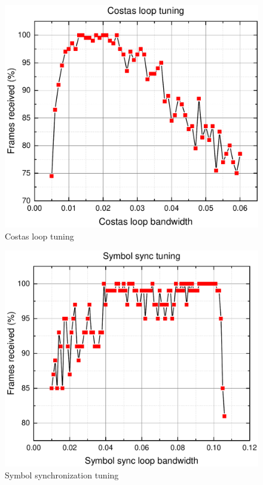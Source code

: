 \begin{figure}[H]
    \centering
    \includegraphics[width=0.6\paperwidth]{img/7/costasG.pdf}
    \caption{Costas loop tuning}
    \label{sensitivity_costas}
\end{figure}

\begin{figure}[H]
    \centering
    \includegraphics[width=0.6\paperwidth]{img/7/symbolsyncG.pdf}
    \caption{Symbol synchronization tuning}
    \label{sensitivity_bitsync}
\end{figure}


